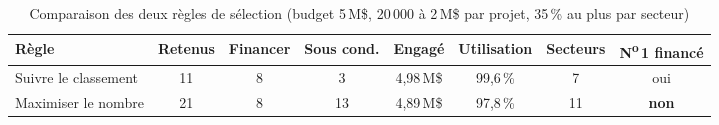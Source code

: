 \begin{table}[htbp]
\centering
\small\setlength{\tabcolsep}{4pt}
\caption{Comparaison des deux règles de sélection (budget 5\,M\$, 20\,000 à 2\,M\$ par projet, 35\,\% au plus par secteur)}\label{tab:arbitrage-regles}
\begin{tabular}{lccccccc}
\toprule
Règle & Retenus & Financer & Sous cond. & Engagé & Utilisation & Secteurs & N\textsuperscript{o}\,1 financé \\
\midrule
Suivre le classement & 11 & 8 & 3 & 4,98\,M\$ & 99,6\,\% & 7 & oui \\
Maximiser le nombre & 21 & 8 & 13 & 4,89\,M\$ & 97,8\,\% & 11 & \textbf{non} \\
\bottomrule
\end{tabular}
\end{table}
